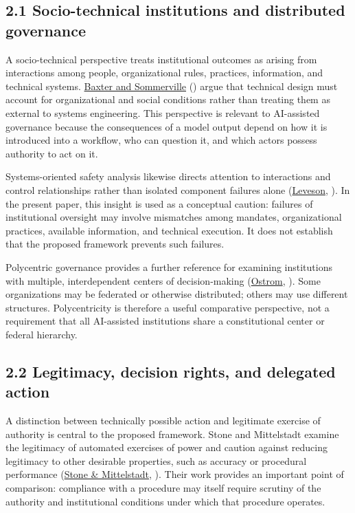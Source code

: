 \documentclass[
  10pt,
]{article}
\newcommand{\axCite}[2]{\hyperlink{cite.#1}{#2}, \citeyear{#1}}
\newcommand{\axCitet}[2]{\hyperlink{cite.#1}{#2} (\citeyear{#1})}
\begin{document}
\subsection{2.1 Socio-technical institutions and distributed
governance}\label{socio-technical-institutions-and-distributed-governance}

A socio-technical perspective treats institutional outcomes as arising
from interactions among people, organizational rules, practices,
information, and technical systems. \axCitet{baxter2011sociotechnical}{Baxter and Sommerville} argue
that technical design must account for organizational and social
conditions rather than treating them as external to systems engineering.
This perspective is relevant to AI-assisted governance because the
consequences of a model output depend on how it is introduced into a
workflow, who can question it, and which actors possess authority to act
on it.

Systems-oriented safety analysis likewise directs attention to
interactions and control relationships rather than isolated component
failures alone (\axCite{leveson2012engineering}{Leveson}). In the present paper, this insight is
used as a conceptual caution: failures of institutional oversight may
involve mismatches among mandates, organizational practices, available
information, and technical execution. It does not establish that the
proposed framework prevents such failures.

Polycentric governance provides a further reference for examining
institutions with multiple, interdependent centers of decision-making
(\axCite{ostrom2010beyond}{Ostrom}). Some organizations may be federated or otherwise
distributed; others may use different structures. Polycentricity is
therefore a useful comparative perspective, not a requirement that all
AI-assisted institutions share a constitutional center or federal
hierarchy.

\subsection{2.2 Legitimacy, decision rights, and delegated
action}\label{legitimacy-decision-rights-and-delegated-action}

A distinction between technically possible action and legitimate
exercise of authority is central to the proposed framework. Stone and
Mittelstadt examine the legitimacy of automated exercises of power and
caution against reducing legitimacy to other desirable properties, such
as accuracy or procedural performance (\axCite{stone2026legitimate}{Stone \& Mittelstadt}).
Their work provides an important point of comparison: compliance with a
procedure may itself require scrutiny of the authority and institutional
conditions under which that procedure operates.
\end{document}
